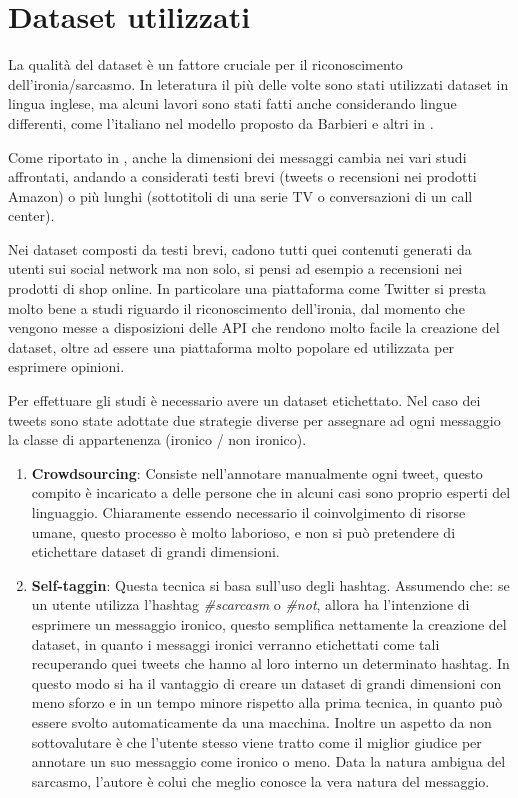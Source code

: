 \documentclass[oneside]{book}
\begin{document}
\section{Dataset utilizzati}
La qualità del dataset è un fattore cruciale per il riconoscimento dell'ironia/sarcasmo. In leteratura il più delle volte sono stati utilizzati dataset in lingua inglese, ma alcuni lavori sono stati fatti anche considerando lingue differenti, come l'italiano nel modello proposto da Barbieri e altri in \cite{sarcasm-ita}.

Come riportato in \cite{survey5}, anche la dimensioni dei messaggi cambia nei vari studi affrontati, andando a considerati testi brevi (tweets o  recensioni nei prodotti Amazon) o più lunghi (sottotitoli di una serie TV o conversazioni di un call center).

Nei dataset composti da testi brevi, cadono tutti quei contenuti generati da utenti sui social network ma non solo, si pensi ad esempio a recensioni nei prodotti di shop online. In particolare una piattaforma come Twitter si presta molto bene a studi riguardo il riconoscimento dell'ironia, dal momento che vengono messe a disposizioni delle API che rendono molto facile la creazione del dataset, oltre ad essere una piattaforma molto popolare ed utilizzata per esprimere opinioni.

Per effettuare gli studi è necessario avere un dataset etichettato.
Nel caso dei tweets sono state adottate due strategie diverse per assegnare ad ogni messaggio la classe di appartenenza (ironico / non ironico).

\begin{enumerate}
	\item \textbf{Crowdsourcing}: Consiste nell'annotare manualmente ogni tweet, questo compito è incaricato a delle persone che in alcuni casi \cite{crowd} sono proprio esperti del linguaggio. Chiaramente essendo necessario il coinvolgimento di risorse umane, questo processo è molto laborioso, e non si può pretendere di etichettare dataset di grandi dimensioni.
	\item \textbf{Self-taggin}: Questa tecnica si basa sull'uso degli hashtag. Assumendo che: se un utente utilizza l'hashtag \textit{\#scarcasm} o \textit{\#not}, allora ha l'intenzione di esprimere un messaggio ironico, questo semplifica nettamente la creazione del dataset, in quanto i messaggi ironici verranno etichettati come tali recuperando quei tweets che hanno al loro interno un determinato hashtag. In questo modo si ha il vantaggio di creare un dataset di grandi dimensioni con meno sforzo e in un tempo minore rispetto alla prima tecnica, in quanto può essere svolto automaticamente da una macchina. Inoltre un aspetto da non sottovalutare è che l'utente stesso viene tratto come il miglior giudice per annotare un suo messaggio come ironico o meno. Data la natura ambigua del sarcasmo, l'autore è colui che meglio conosce la vera natura del messaggio.
	
\end{enumerate}
\end{document}
